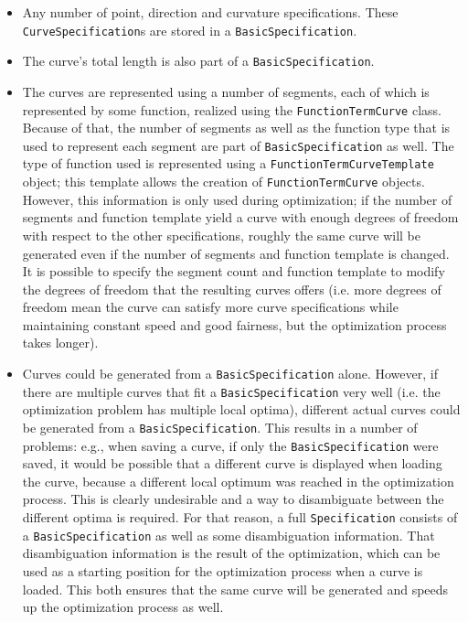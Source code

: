 \documentclass[a4paper]{article}
\begin{document}
					\begin{itemize}
						\item Any number of point, direction and curvature specifications. These \verb|CurveSpecification|s are stored in a \verb|BasicSpecification|.
						\item The curve's total length is also part of a \verb|BasicSpecification|.
						\item The curves are represented using a number of segments, each of which is represented by some function, realized using the \verb|FunctionTermCurve| class. Because of that, the number of segments as well as the function type that is used to represent each segment are part of \verb|BasicSpecification| as well. 
						The type of function used is represented using a \verb|FunctionTermCurveTemplate| object; this template allows the creation of \verb|FunctionTermCurve| objects.  
						However, this information is only used during optimization; if the number of segments and function template yield a curve with enough degrees of freedom with respect to the other specifications, roughly the same curve will be generated even if the number of segments and function template is changed. It is possible to specify the segment count and function template to modify the degrees of freedom that the resulting curves offers (i.e. more degrees of freedom mean the curve can satisfy more curve specifications while maintaining constant speed and good fairness, but the optimization process takes longer).
						\item Curves could be generated from a \verb|BasicSpecification| alone. However, if there are multiple curves that fit a \verb|BasicSpecification| very well (i.e. the optimization problem has multiple local optima), different actual curves could be generated from a \verb|BasicSpecification|. This results in a number of problems: e.g., when saving a curve, if only the \verb|BasicSpecification| were saved, it would be possible that a different curve is displayed when loading the curve, because a different local optimum was reached in the optimization process. This is clearly undesirable and a way to disambiguate between the different optima is required. 
						For that reason, a full \verb|Specification| consists of a \verb|BasicSpecification| as well as some disambiguation information. That disambiguation information is the result of the optimization, which can be used as a starting position for the optimization process when a curve is loaded. This both ensures that the same curve will be generated and speeds up the optimization process as well.
					\end{itemize}
				
\end{document}
